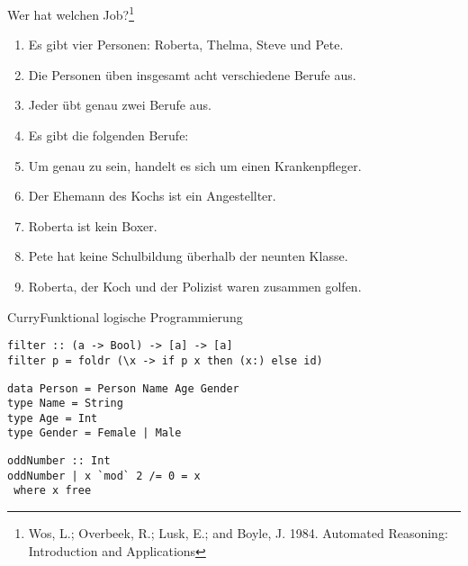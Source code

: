 \documentclass[hyperref={pdfpagelabels=false}]{beamer}
\begin{document}
\begin{frame}{Wer hat welchen Job?\footnote{Wos, L.; Overbeek, R.; Lusk, E.; and Boyle, J. 1984. Automated Reasoning: Introduction and Applications}}
\begin{enumerate}
\item<1-> Es gibt vier Personen: Roberta, Thelma, Steve und Pete.
\item {\color{black!12}Die Personen \"uben insgesamt acht verschiedene Berufe aus.}
\item{\color{black!12}Jeder \"ubt genau zwei Berufe aus.}
\item<2-> Es gibt die folgenden Berufe: 
\item {\color{black!12}Um genau zu sein, handelt es sich um einen Krankenpfleger.}
\item {\color{black!12}Der Ehemann des Kochs ist ein Angestellter.}
\item<4-> Roberta ist kein Boxer.
\item {\color{black!12}Pete hat keine Schulbildung \"uberhalb der neunten Klasse.}
\item<5-> Roberta, der Koch und der Polizist waren zusammen golfen.
\end{enumerate}
\end{frame}


\lstset{language=Haskell}

\begin{frame}[fragile]{Curry}{Funktional logische Programmierung}
\begin{lstlisting}
filter :: (a -> Bool) -> [a] -> [a]
filter p = foldr (\x -> if p x then (x:) else id)
\end{lstlisting}

\begin{lstlisting}
data Person = Person Name Age Gender
type Name = String
type Age = Int
type Gender = Female | Male
\end{lstlisting}

\begin{lstlisting}
oddNumber :: Int
oddNumber | x `mod` 2 /= 0 = x
 where x free
\end{lstlisting}
\end{frame}
\end{document}
